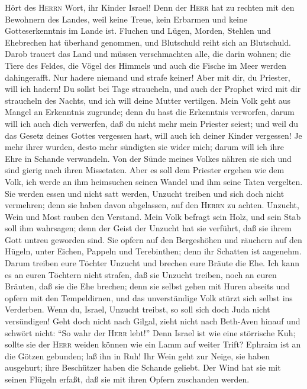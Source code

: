  Hört des \textsc{Herrn} Wort, ihr Kinder Israel! Denn der
\textsc{Herr} hat zu rechten mit den Bewohnern des Landes, weil keine
Treue, kein Erbarmen und keine Gotteserkenntnis im Lande ist.
 Fluchen und Lügen, Morden, Stehlen und Ehebrechen hat
überhand genommen, und Blutschuld reiht sich an Blutschuld.
 Darob trauert das Land und müssen verschmachten alle, die
darin wohnen; die Tiere des Feldes, die Vögel des Himmels und auch die
Fische im Meer werden dahingerafft.  Nur hadere niemand
und strafe keiner! Aber mit dir, du Priester, will ich hadern!
 Du sollst bei Tage straucheln, und auch der Prophet wird
mit dir straucheln des Nachts, und ich will deine Mutter vertilgen.
 Mein Volk geht aus Mangel an Erkenntnis zugrunde; denn du
hast die Erkenntnis verworfen, darum will ich auch dich verwerfen, daß
du nicht mehr mein Priester seiest; und weil du das Gesetz deines Gottes
vergessen hast, will auch ich deiner Kinder vergessen!  Je
mehr ihrer wurden, desto mehr sündigten sie wider mich; darum will ich
ihre Ehre in Schande verwandeln.  Von der Sünde meines
Volkes nähren sie sich und sind gierig nach ihren Missetaten.
 Aber es soll dem Priester ergehen wie dem Volk, ich werde
an ihm heimsuchen seinen Wandel und ihm seine Taten vergelten.
 Sie werden essen und nicht satt werden, Unzucht treiben
und sich doch nicht vermehren; denn sie haben davon abgelassen, auf den
\textsc{Herrn} zu achten.  Unzucht, Wein und Most rauben
den Verstand.  Mein Volk befragt sein Holz, und sein Stab
soll ihm wahrsagen; denn der Geist der Unzucht hat sie verführt, daß sie
ihrem Gott untreu geworden sind.  Sie opfern auf den
Bergeshöhen und räuchern auf den Hügeln, unter Eichen, Pappeln und
Terebinthen; denn ihr Schatten ist angenehm. Darum treiben eure Töchter
Unzucht und brechen eure Bräute die Ehe.  Ich kann es an
euren Töchtern nicht strafen, daß sie Unzucht treiben, noch an euren
Bräuten, daß sie die Ehe brechen; denn sie selbst gehen mit Huren
abseits und opfern mit den Tempeldirnen, und das unverständige Volk
stürzt sich selbst ins Verderben.  Wenn du, Israel,
Unzucht treibst, so soll sich doch Juda nicht versündigen! Geht doch
nicht nach Gilgal, zieht nicht nach Beth-Aven hinauf und schwört nicht:
``So wahr der \textsc{Herr} lebt!''  Denn Israel ist wie
eine störrische Kuh; sollte sie der \textsc{Herr} weiden können wie ein
Lamm auf weiter Trift?  Ephraim ist an die Götzen
gebunden; laß ihn in Ruh!  Ihr Wein geht zur Neige, sie
haben ausgehurt; ihre Beschützer haben die Schande geliebt.
 Der Wind hat sie mit seinen Flügeln erfaßt, daß sie mit
ihren Opfern zuschanden werden.

